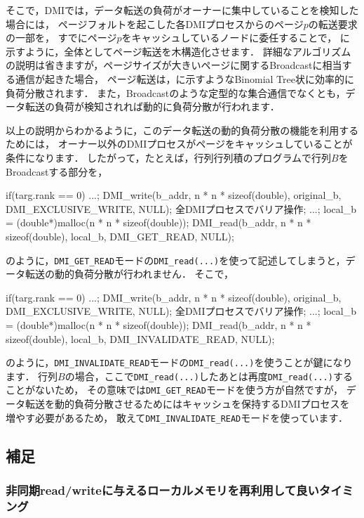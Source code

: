 \documentclass[report,12pt]{jsbook}
\begin{document}
そこで，DMIでは，データ転送の負荷がオーナーに集中していることを検知した場合には，
ページフォルトを起こした各DMIプロセスからのページ$p$の転送要求の一部を，
すでにページ$p$をキャッシュしているノードに委任することで，
に示すように，全体としてページ転送を木構造化させます．
詳細なアルゴリズムの説明は省きますが，ページサイズが大きいページに関するBroadcastに相当する通信が起きた場合，
ページ転送は，に示すようなBinomial Tree状に効率的に負荷分散されます．
また，Broadcastのような定型的な集合通信でなくとも，データ転送の負荷が検知されれば動的に負荷分散が行われます．

以上の説明からわかるように，このデータ転送の動的負荷分散の機能を利用するためには，
オーナー以外のDMIプロセスがページをキャッシュしていることが条件になります．
したがって，たとえば，行列行列積のプログラムで行列$B$をBroadcastする部分を，
\begin{code}
if(targ.rank == 0)
  {
    ...;
    DMI_write(b_addr, n * n * sizeof(double), original_b, DMI_EXCLUSIVE_WRITE, NULL);
  }
全DMIプロセスでバリア操作;
...;
local_b = (double*)malloc(n * n * sizeof(double));
DMI_read(b_addr, n * n * sizeof(double), local_b, DMI_GET_READ, NULL);
\end{code}
のように，\texttt{DMI\_GET\_READ}モードの\texttt{DMI\_read(...)}を使って記述してしまうと，データ転送の動的負荷分散が行われません．
そこで，
\begin{code}
if(targ.rank == 0)
  {
    ...;
    DMI_write(b_addr, n * n * sizeof(double), original_b, DMI_EXCLUSIVE_WRITE, NULL);
  }
全DMIプロセスでバリア操作;
...;
local_b = (double*)malloc(n * n * sizeof(double));
DMI_read(b_addr, n * n * sizeof(double), local_b, DMI_INVALIDATE_READ, NULL);
\end{code}
のように，\texttt{DMI\_INVALIDATE\_READ}モードの\texttt{DMI\_read(...)}を使うことが鍵になります．
行列$B$の場合，ここで\texttt{DMI\_read(...)}したあとは再度\texttt{DMI\_read(...)}することがないため，
その意味では\texttt{DMI\_GET\_READ}モードを使う方が自然ですが，
データ転送を動的負荷分散させるためにはキャッシュを保持するDMIプロセスを増やす必要があるため，
敢えて\texttt{DMI\_INVALIDATE\_READ}モードを使っています．


\subsection{補足}

\subsubsection{非同期read/writeに与えるローカルメモリを再利用して良いタイミング}
\end{document}
